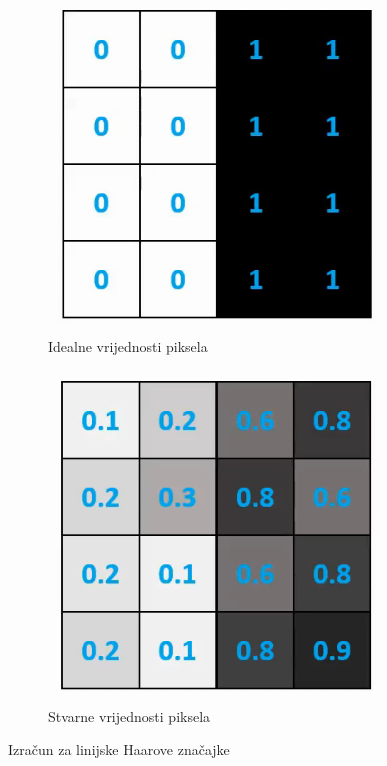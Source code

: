 \begin{figure}[htb]
	\centering
	\begin{subfigure}[b]{0.4\linewidth}
		\includegraphics[width=\linewidth]{img/IdealHaarFeatures.png}
		\caption{Idealne vrijednosti piksela}
		\label{img:haar-ideal-features}
	\end{subfigure}
	\begin{subfigure}[b]{0.4\linewidth}
		\includegraphics[width=\linewidth]{img/RealHaarFeatures.png}
		\caption{Stvarne vrijednosti piksela}
		\label{img:haar-real-features}
	\end{subfigure}
	\caption{Izračun za linijske Haarove značajke}
	\label{img:haar-calc}
\end{figure}


